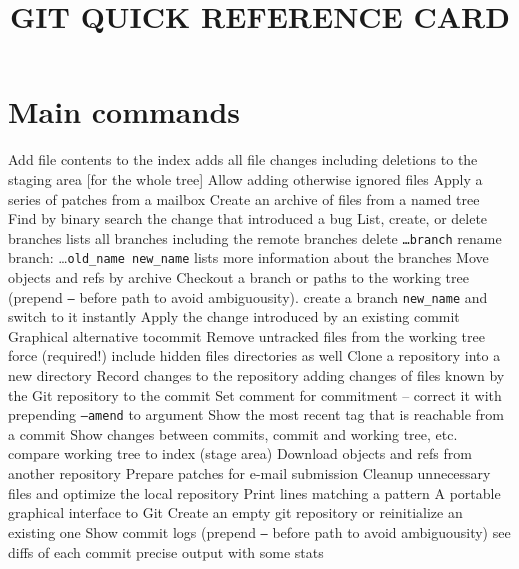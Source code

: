 
\title{GIT QUICK REFERENCE CARD}

\shortcopyrightnotice

\section{Main commands}
	{Add file contents to the index}
	{adds all file changes including deletions to the staging area [for the whole tree]}
	{Allow adding otherwise ignored files}
	{Apply a series of patches from a mailbox}
	{Create an archive of files from a named tree}
	{Find by binary search the change that introduced a bug}
	{List, create, or delete branches}
	{lists all branches including the remote branches}
	{delete {\tt \dots branch}}
	{rename branch: \dots {\tt old\_name new\_name}}
	{lists more information about the branches}
	{Move objects and refs by archive}
	{Checkout a branch or paths to the working tree (prepend {\tt --} before path to avoid ambiguousity).}
	{create a branch {\tt new\_name} and switch to it instantly}
	{Apply the change introduced by an existing commit}
	{Graphical alternative tocommit}
	{Remove untracked files from the working tree}
	{force (required!)}
	{include hidden files}
	{directories as well}
	{Clone a repository into a new directory}
	{Record changes to the repository}
	{adding changes of files known by the Git repository to the commit}
	{Set comment for commitment -- correct it with prepending {\tt --amend} to argument}
	{Show the most recent tag that is reachable from a commit}
	{Show changes between commits, commit and working tree, etc.}
	{compare working tree to index (stage area)}
	{Download objects and refs from another repository}
	{Prepare patches for e-mail submission}
	{Cleanup unnecessary files and optimize the local repository}
	{Print lines matching a pattern}
	{A portable graphical interface to Git}
	{Create an empty git repository or reinitialize an existing one}
	{Show commit logs (prepend {\tt --} before path to avoid ambiguousity)}
	{see diffs of each commit}
	{precise output with some stats}
